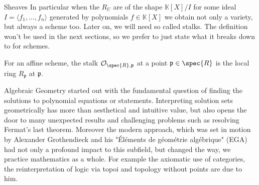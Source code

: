 \begin{section}{Sheaves}
In particular when the \( R_U \) are of the shape \( \mathbb{K}[X] / I \) for some ideal 
\( I = \langle f_1, \dots, f_n \rangle \) generated by polynomials \( f \in \mathbb{K}[X] \) we obtain not only a variety, but always a scheme too.
Later on, we will need so called stalks. The definition won't be used in the next sections, so we prefer to just state what it breaks down to for schemes. 
\begin{example}
    For an affine scheme, the stalk \( \mathcal{O}_{\spec{R}, \mathfrak{p}} \) at a point \( \mathfrak{p} \in \spec{R} \) is the local ring \( R_{\mathfrak{p}} \) at \( \mathfrak{p} \).
\end{example}

Algebraic Geometry started out with the fundamental question of finding the solutions to polynomial equations or statements.
Interpreting solution sets geometrically has more than aesthetical and intuitive value, but also opens the door to many
unexpected results and challenging problems such as resolving Fermat's last theorem.
Moreover the modern approach, which was set in motion by Alexander Grothendieck and his "Éléments de géométrie algébrique" (EGA) had  
not only a profound impact to this subfield, but changed the way, we practice mathematics as a whole. For example the axiomatic use 
of categories, the reinterpretation of logic via topoi and topology without points are due to him. 


\end{section}

